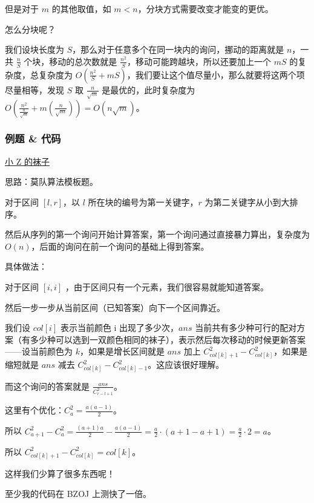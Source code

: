 但是对于 $m$ 的其他取值，如 $m<n$，分块方式需要改变才能变的更优。

怎么分块呢？

我们设块长度为 $S$，那么对于任意多个在同一块内的询问，挪动的距离就是 $n$，一共 $\displaystyle \frac{n}{S}$ 个块，移动的总次数就是 $\displaystyle \frac{n^2}{S}$，移动可能跨越块，所以还要加上一个 $mS$ 的复杂度，总复杂度为 $\displaystyle O\left(\frac{n^2}{S}+mS\right)$，我们要让这个值尽量小，那么就要将这两个项尽量相等，发现 $S$ 取 $\displaystyle \frac{n}{\sqrt{m}}$ 是最优的，此时复杂度为 $\displaystyle O\left(\frac{n^2}{\displaystyle \frac{n}{\sqrt{m}}}+m\left(\frac{n}{\sqrt{m}}\right)\right)=O(n\sqrt{m})$。

\subsubsection{例题 \& 代码}

\href{https://www.lydsy.com/JudgeOnline/problem.php?id=2038}{小 Z 的袜子}

思路：莫队算法模板题。

对于区间 $[l,r]$，以 $l$ 所在块的编号为第一关键字，$r$ 为第二关键字从小到大排序。

然后从序列的第一个询问开始计算答案，第一个询问通过直接暴力算出，复杂度为 $O(n)$，后面的询问在前一个询问的基础上得到答案。

具体做法：

对于区间 $[i,i]$ ，由于区间只有一个元素，我们很容易就能知道答案。

然后一步一步从当前区间（已知答案）向下一个区间靠近。

我们设 $col[i]$ 表示当前颜色 i 出现了多少次，$ans$ 当前共有多少种可行的配对方案（有多少种可以选到一双颜色相同的袜子），表示然后每次移动的时候更新答案——设当前颜色为 $k$，如果是增长区间就是 $ans$ 加上 $C_{col[k]+1}^2-C_{col[k]}^2$，如果是缩短就是 $ans$ 减去 $C_{col[k]}^2-C_{col[k]-1}^2$。这应该很好理解。

而这个询问的答案就是 $\displaystyle \frac{ans}{C_{r-l+1}^2}$。

这里有个优化：$\displaystyle C_a^2=\frac{a (a-1)}{2}$。

所以 $\displaystyle C_{a+1}^2-C_a^2=\frac{(a+1) a}{2}-\frac{a (a-1)}{2}=\frac{a}{2}\cdot (a+1-a+1)=\frac{a}{2}\cdot 2=a$。

所以 $C_{col[k]+1}^2-C_{col[k]}^2=col[k]$。

这样我们少算了很多东西呢！

至少我的代码在 BZOJ 上测快了一倍。

